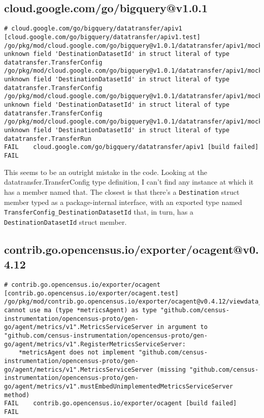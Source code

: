 \subsection{cloud.google.com/go/bigquery@v1.0.1}
\begin{verbatim}
# cloud.google.com/go/bigquery/datatransfer/apiv1 [cloud.google.com/go/bigquery/datatransfer/apiv1.test]
/go/pkg/mod/cloud.google.com/go/bigquery@v1.0.1/datatransfer/apiv1/mock_test.go:428:3: unknown field 'DestinationDatasetId' in struct literal of type datatransfer.TransferConfig
/go/pkg/mod/cloud.google.com/go/bigquery@v1.0.1/datatransfer/apiv1/mock_test.go:507:3: unknown field 'DestinationDatasetId' in struct literal of type datatransfer.TransferConfig
/go/pkg/mod/cloud.google.com/go/bigquery@v1.0.1/datatransfer/apiv1/mock_test.go:638:3: unknown field 'DestinationDatasetId' in struct literal of type datatransfer.TransferConfig
/go/pkg/mod/cloud.google.com/go/bigquery@v1.0.1/datatransfer/apiv1/mock_test.go:845:3: unknown field 'DestinationDatasetId' in struct literal of type datatransfer.TransferRun
FAIL	cloud.google.com/go/bigquery/datatransfer/apiv1 [build failed]
FAIL
\end{verbatim}

This seems to be an outright mistake in the code. Looking at the
datatransfer.TransferConfig type definition, I can't find any instance
at which it has a member named that. The closest is that there's a
{\tt Destination} struct member typed as a package-internal interface,
with an exported type named  {\tt TransferConfig\_DestinationDatasetId}
that, in turn, has a {\tt DestinationDatasetId} struct member.

\subsection{contrib.go.opencensus.io/exporter/ocagent@v0.4.12}
\begin{verbatim}
# contrib.go.opencensus.io/exporter/ocagent [contrib.go.opencensus.io/exporter/ocagent.test]
/go/pkg/mod/contrib.go.opencensus.io/exporter/ocagent@v0.4.12/viewdata_to_metrics_test.go:51:45: cannot use ma (type *metricsAgent) as type "github.com/census-instrumentation/opencensus-proto/gen-go/agent/metrics/v1".MetricsServiceServer in argument to "github.com/census-instrumentation/opencensus-proto/gen-go/agent/metrics/v1".RegisterMetricsServiceServer:
	*metricsAgent does not implement "github.com/census-instrumentation/opencensus-proto/gen-go/agent/metrics/v1".MetricsServiceServer (missing "github.com/census-instrumentation/opencensus-proto/gen-go/agent/metrics/v1".mustEmbedUnimplementedMetricsServiceServer method)
FAIL	contrib.go.opencensus.io/exporter/ocagent [build failed]
FAIL
\end{verbatim}

